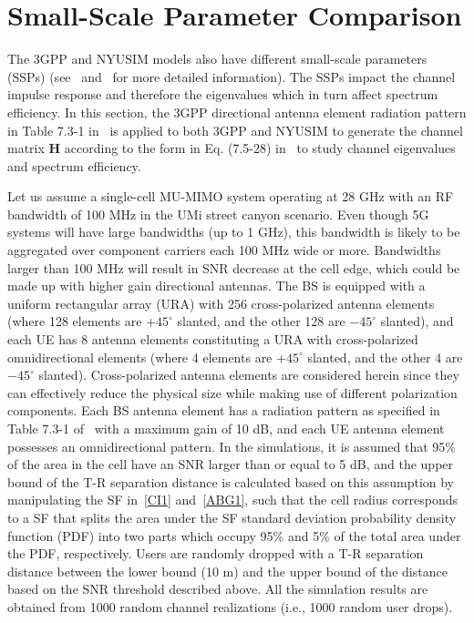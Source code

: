 \documentclass[journal]{IEEEtran}
\begin{document}
\section{Small-Scale Parameter Comparison}
The 3GPP and NYUSIM models also have different small-scale parameters (SSPs) (see~\cite{3GPP_Dec} and~\cite{Samimi15:MTT,Samimi16:EuCAP} for more detailed information). The SSPs impact the channel impulse response and therefore the eigenvalues which in turn affect spectrum efficiency. In this section, the 3GPP directional antenna element radiation pattern in Table 7.3-1 in~\cite{3GPP_Dec} is applied to both 3GPP and NYUSIM to generate the channel matrix \textbf{H} according to the form in Eq. (7.5-28) in~\cite{3GPP_Dec} to study channel eigenvalues and spectrum efficiency. 

 Let us assume a single-cell MU-MIMO system operating at 28 GHz with an RF bandwidth of 100 MHz in the UMi street canyon scenario. Even though 5G systems will have large bandwidths (up to 1 GHz), this bandwidth is likely to be aggregated over component carriers each 100 MHz wide or more. Bandwidths larger than 100 MHz will result in SNR decrease at the cell edge, which could be made up with higher gain directional antennas. The BS is equipped with a uniform rectangular array (URA) with 256 cross-polarized antenna elements (where 128 elements are $+45^\circ$ slanted, and the other 128 are $-45^\circ$ slanted), and each UE has 8 antenna elements constituting a URA with cross-polarized omnidirectional elements (where 4 elements are $+45^\circ$ slanted, and the other 4 are $-45^\circ$ slanted). Cross-polarized antenna elements are considered herein since they can effectively reduce the physical size while making use of different polarization components. Each BS antenna element has a radiation pattern as specified in Table 7.3-1 of~\cite{3GPP_Dec} with a maximum gain of 10 dB, and each UE antenna element possesses an omnidirectional pattern. In the simulations, it is assumed that 95\% of the area in the cell have an SNR larger than or equal to 5 dB, and the upper bound of the T-R separation distance is calculated based on this assumption by manipulating the SF in~\eqref{CI1} and~\eqref{ABG1}, such that the cell radius corresponds to a SF that splits the area under the SF standard deviation probability density function (PDF) into two parts which occupy 95\% and 5\% of the total area under the PDF, respectively. Users are randomly dropped with a T-R separation distance between the lower bound (10 m) and the upper bound of the distance based on the SNR threshold described above. All the simulation results are obtained from 1000 random channel realizations (i.e., 1000 random user drops).
\end{document}
